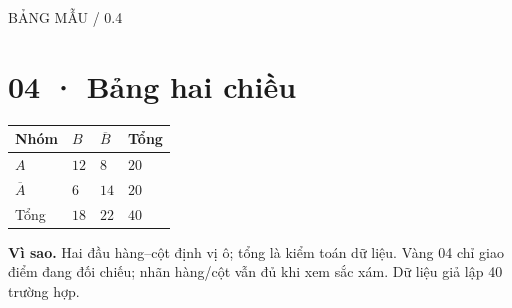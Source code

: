 \documentclass[11pt,a4paper]{article}
\newcommand{\tagline}[1]{{\small\color{muted}\MakeUppercase{#1}}\par}
\newcommand{\why}[1]{\par{\small\color{muted}\textbf{Vì sao.} #1}\par}
\begin{document}
\tagline{Bảng mẫu / 0.4}\section*{04 · Bảng hai chiều}
\begin{tabularx}{\linewidth}{|>{\centering\arraybackslash}X|>{\centering\arraybackslash}X|>{\centering\arraybackslash}X|>{\centering\arraybackslash}X|}\hline
\rowcolor{head}Nhóm & $B$ & $\overline B$ & Tổng\\\hline
$A$ & $12$ & $8$ & $20$\\\hline
$\overline A$ & $6$ & $14$ & $20$\\\hline
\rowcolor{head}Tổng & $18$ & $22$ & $40$\\\hline\end{tabularx}\why{Hai đầu hàng–cột định vị ô; tổng là kiểm toán dữ liệu. Vàng 04 chỉ giao điểm đang đối chiếu; nhãn hàng/cột vẫn đủ khi xem sắc xám. Dữ liệu giả lập 40 trường hợp.}
\end{document}

